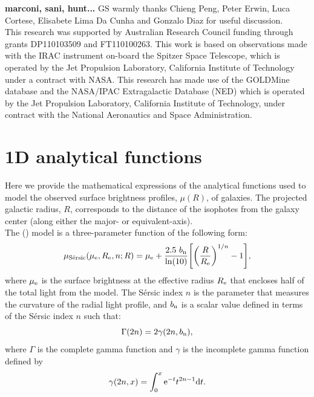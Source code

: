 \documentclass[preprint2]{emulateapj}
\begin{document}
\acknowledgments
{\bf marconi, sani, hunt...}
GS warmly thanks Chieng Peng, Peter Erwin, Luca Cortese, Elisabete Lima Da Cunha and Gonzalo Diaz 
for useful discussion. \\
This research was supported by Australian Research Council funding through grants
DP110103509 and FT110100263.
This work is based on observations made with the IRAC instrument \citep{fazio2004IRAC} 
on-board the Spitzer Space Telescope, 
which is operated by the Jet Propulsion Laboratory, 
California Institute of Technology under a contract with NASA.
This research has made use of the GOLDMine database \citep{goldmine} and the NASA/IPAC Extragalactic Database (NED) 
which is operated by the Jet Propulsion Laboratory, California Institute of Technology, 
under contract with the National Aeronautics and Space Administration. 

\appendix

\section{1D analytical functions}
\label{sec:app1}
Here we provide the mathematical expressions of the analytical functions used to model 
the observed surface brightness profiles, $\mu(R)$, of galaxies.
The projected galactic radius, $R$,
corresponds to the distance of the isophotes from the galaxy center (along either the major- or equivalent-axis). \\

The \citeauthor{sersic1963} (\citeyear{sersic1963,sersic1968}) model is a three-parameter function of the following form:
\begin{equation}
\mu_{\rm S\acute{e}rsic}(\mu_{\rm e},R_{\rm e},n;R) = \mu_{\rm e} + \frac{2.5~b_{\rm n}}{\ln(10)} 
\Biggl[\biggl(\frac{R}{R_{\rm e}}\biggr)^{1/n}-1\Biggr] ,
\end{equation}
\citep{caon1993,andredakis1995,grahamdriver2005}
where $\mu_{\rm e}$ is the surface brightness at the effective radius $R_{\rm e}$ that encloses 
half of the total light from the model. 
The S\'ersic index $n$ is the parameter that measures the curvature of the radial light profile,
and $b_{\rm n}$ is a scalar value defined in terms of the S\'ersic index $n$ such that:
\begin{equation}
\Gamma(2n) = 2\gamma(2n,b_{\rm n}),
\end{equation}
where $\Gamma$ is the complete gamma function \citep{ciotti1991} 
and $\gamma$ is the incomplete gamma function defined by 
\begin{equation}
\gamma(2n,x) = \int_{0}^{x} {\rm e}^{-t} t^{2n-1} {\rm d}t .
\end{equation} \\
\end{document}
